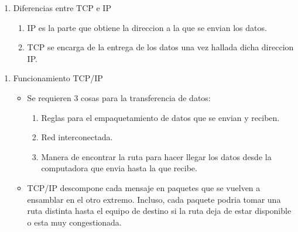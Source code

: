 \documentclass[11pt]{article}
\begin{document}
\begin{enumerate}
\begin{itemize}
\begin{enumerate}
\item Diferencias entre TCP e IP
\begin{enumerate}
\item IP es la parte que obtiene la direccion a la que se envian los datos.
\item TCP se encarga de la entrega de los datos una vez hallada dicha direccion IP.
\end{enumerate}
\end{enumerate}
\end{itemize}
\begin{enumerate}
\item Funcionamiento TCP/IP
\label{sec:org5e9bb9a}
\begin{itemize}
\item Se requieren 3 cosas para la transferencia de datos:
\begin{enumerate}
\item Reglas para el empaquetamiento de datos que se envian y reciben.
\item Red interconectada.
\item Manera de encontrar la ruta para hacer llegar los datos desde la computadora que envia hasta la que recibe.
\end{enumerate}

\item TCP/IP descompone cada mensaje en paquetes que se vuelven a ensamblar en el otro extremo. Incluso, cada paquete podria tomar una ruta distinta hasta el equipo de destino si la ruta deja de estar disponible o esta muy congestionada.


\end{itemize}
\end{enumerate}
\end{enumerate}
\end{document}
